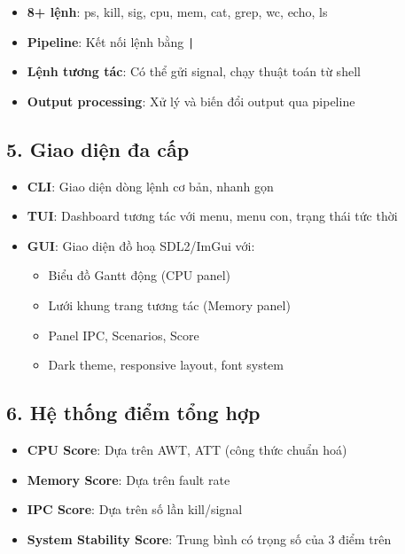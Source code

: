 \begin{itemize}[leftmargin=1.5cm]
  \item \textbf{8+ lệnh}: ps, kill, sig, cpu, mem, cat, grep, wc, echo, ls
  \item \textbf{Pipeline}: Kết nối lệnh bằng \texttt{|}
  \item \textbf{Lệnh tương tác}: Có thể gửi signal, chạy thuật toán từ shell
  \item \textbf{Output processing}: Xử lý và biến đổi output qua pipeline
\end{itemize}

\subsection*{5. Giao diện đa cấp}

\begin{itemize}[leftmargin=1.5cm]
  \item \textbf{CLI}: Giao diện dòng lệnh cơ bản, nhanh gọn
  \item \textbf{TUI}: Dashboard tương tác với menu, menu con, trạng thái tức thời
  \item \textbf{GUI}: Giao diện đồ hoạ SDL2/ImGui với:
  \begin{itemize}
    \item Biểu đồ Gantt động (CPU panel)
    \item Lưới khung trang tương tác (Memory panel)
    \item Panel IPC, Scenarios, Score
    \item Dark theme, responsive layout, font system
  \end{itemize}
\end{itemize}

\subsection*{6. Hệ thống điểm tổng hợp}

\begin{itemize}[leftmargin=1.5cm]
  \item \textbf{CPU Score}: Dựa trên AWT, ATT (công thức chuẩn hoá)
  \item \textbf{Memory Score}: Dựa trên fault rate
  \item \textbf{IPC Score}: Dựa trên số lần kill/signal
  \item \textbf{System Stability Score}: Trung bình có trọng số của 3 điểm trên
\end{itemize}

